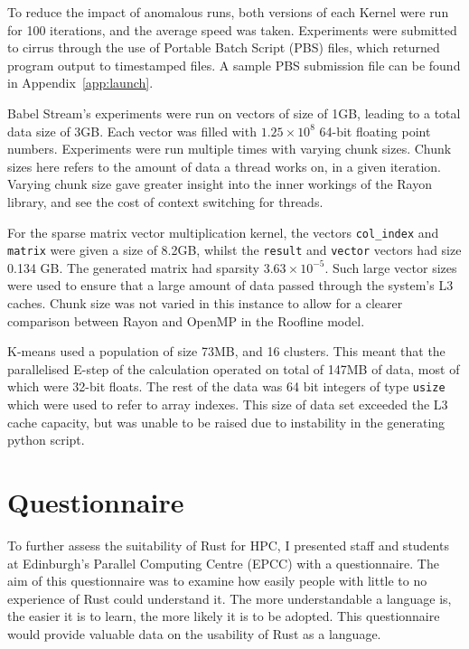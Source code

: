 To reduce the impact of anomalous runs, both versions of each Kernel were run for 100 iterations, and the average speed was taken. Experiments were submitted to cirrus through the use of Portable Batch Script (PBS) files, which returned program output to timestamped files. A sample PBS submission file can be found in Appendix~\ref{app:launch}.

Babel Stream's experiments were run on vectors of size of 1GB, leading to a total data size of 3GB. Each vector was filled with $1.25\times10^8$ 64-bit floating point numbers. Experiments were run multiple times with varying chunk sizes. Chunk sizes here refers to the amount of data a thread works on, in a given iteration. Varying chunk size gave greater insight into the inner workings of the Rayon library, and see the cost of context switching for threads.

For the sparse matrix vector multiplication kernel, the vectors \texttt{col\_index} and \texttt{matrix} were given a size of 8.2GB, whilst the \texttt{result} and \texttt{vector} vectors had size 0.134 GB. The generated matrix had sparsity $3.63 \times 10^{-5}$. Such large vector sizes were used to ensure that a large amount of data passed through the system's L3 caches. Chunk size was not varied in this instance to allow for a clearer comparison between Rayon and OpenMP in the Roofline model.

K-means used a population of size 73MB, and 16 clusters. This meant that the parallelised E-step of the calculation operated on total of 147MB of data, most of which were 32-bit floats. The rest of the data was 64 bit integers of type \texttt{usize} which were used to refer to array indexes. This size of data set exceeded the L3 cache capacity, but was unable to be raised due to instability in the generating python script.
\section{Questionnaire}
To further assess the suitability of Rust for HPC, I presented staff and students at Edinburgh's Parallel Computing Centre (EPCC) with a questionnaire. The aim of this questionnaire was to examine how easily people with little to no experience of Rust could understand it. The more understandable a language is, the easier it is to learn, the more likely it is to be adopted. This questionnaire would provide valuable data on the usability of Rust as a language.

